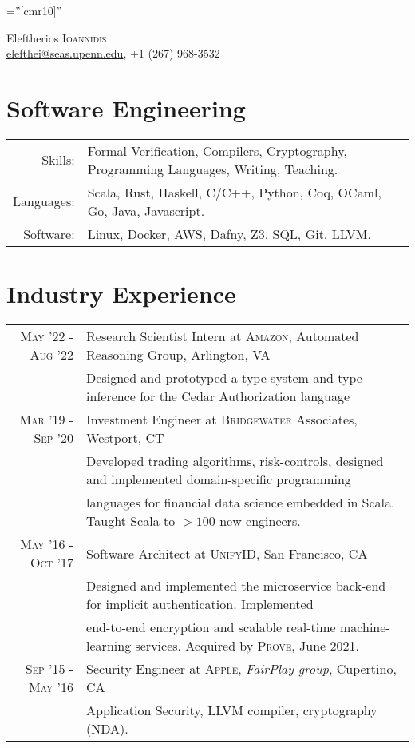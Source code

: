 \documentclass[lettersize,11pt]{article}
\begin{document}
\pagestyle{empty} %
\font\fb=''[cmr10]'' %

\par{\centering
		{\Huge Eleftherios \textsc{Ioannidis}}\\[0.5em]
        \href{mailto:elefthei@seas.upenn.edu}{elefthei@seas.upenn.edu}, +1 (267) 968-3532 \\
	\bigskip\par}

\section{Software Engineering}
\begin{tabular}{rl}
Skills:& Formal Verification, Compilers, Cryptography, Programming Languages, Writing, Teaching. \\
Languages: & Scala, Rust, Haskell, C/C++, Python, Coq, OCaml, Go, Java, Javascript. \\
Software:& Linux, Docker, AWS, Dafny, Z3, SQL, Git, LLVM. \\
\end{tabular}

\section{Industry Experience}
\begin{tabular}{rl}
\textsc{May} '22 - \textsc{Aug} '22 & Research Scientist Intern at \textsc{Amazon}, Automated Reasoning Group, Arlington, VA\\
&\footnotesize{Designed and prototyped a type system and type inference for the Cedar Authorization language}\\[0.5em]

\textsc{Mar} '19 - \textsc{Sep} '20 & Investment Engineer at \textsc{Bridgewater} Associates, Westport, CT\\
&\footnotesize{Developed trading algorithms, risk-controls, designed and implemented domain-specific programming}\\
&\footnotesize{languages for financial data science embedded in Scala. Taught Scala to $>100$ new engineers.}\\[0.5em]

\textsc{May} '16 - \textsc{Oct} '17 & Software Architect at \textsc{UnifyID}, San Francisco, CA\\
&\footnotesize{Designed and implemented the microservice back-end for implicit authentication. Implemented}\\
&\footnotesize{end-to-end encryption and scalable real-time machine-learning services. Acquired by \textsc{Prove}, June 2021.}\\[0.5em]

\textsc{Sep} '15 - \textsc{May} '16 & Security Engineer at \textsc{Apple}, \emph{FairPlay group}, Cupertino, CA \\
&\footnotesize{Application Security, LLVM compiler, cryptography (NDA).}\\[0.5em]
\end{tabular}
\end{document}
